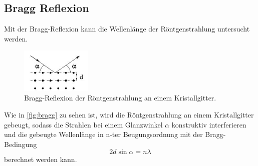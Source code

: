 \subsection{Bragg Reflexion}
Mit der Bragg-Reflexion kann die Wellenlänge der Röntgenstrahlung untersucht werden.
    \begin{figure}[H]
       \centering
        \includegraphics[width=0.3\textwidth]{images/bragg.jpg}
        \caption{Bragg-Reflexion der Röntgenstrahlung an einem Kristallgitter. \cite{603}}
       \label{fig:bragg}
    \end{figure}
    \noindent
    Wie in \autoref{fig:bragg} zu sehen ist, wird die Röntgenstrahlung an einem Kristallgitter gebeugt, sodass die Strahlen bei einem Glanzwinkel $\alpha$ konstruktiv interferieren
    und die gebeugte Wellenlänge in n-ter Beugungsordnung mit der Bragg-Bedingung
    \begin{equation}
        2d \sin{\alpha} = n \lambda
        \label{eqn:bragg}
    \end{equation}
    berechnet werden kann.

